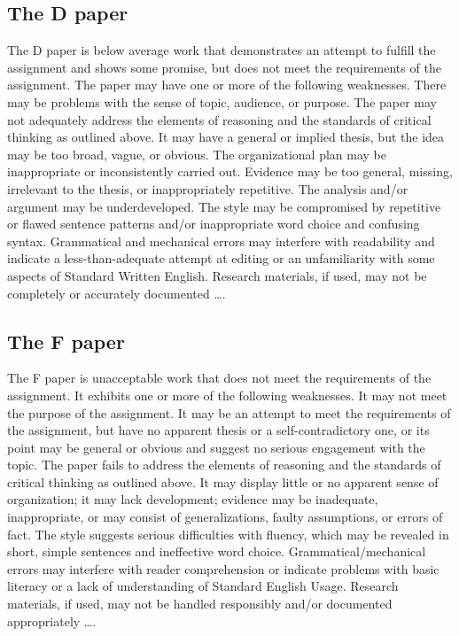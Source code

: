 \subsection{The D paper}

The D paper is below average work that demonstrates an attempt to fulfill the assignment and shows some promise, but does not meet the requirements of the assignment. The paper may have one or more of the following weaknesses. There may be problems with the sense of topic, audience, or purpose. The paper may not adequately address the elements of reasoning and the standards of critical thinking as outlined above. It may have a general or implied thesis, but the idea may be too broad, vague, or obvious. The organizational plan may be inappropriate or inconsistently carried out. Evidence may be too general, missing, irrelevant to the thesis, or inappropriately repetitive. The analysis and/or argument may be underdeveloped. The style may be compromised by repetitive or flawed sentence patterns and/or inappropriate word choice and confusing syntax. Grammatical and mechanical errors may interfere with readability and indicate a less-than-adequate attempt at editing or an unfamiliarity with some aspects of Standard Written English. Research materials, if used, may not be completely or accurately documented \dots.

\subsection{The F paper}

The F paper is unacceptable work that does not meet the requirements of the assignment. It exhibits one or more of the following weaknesses. It may not meet the purpose of the assignment. It may be an attempt to meet the requirements of the assignment, but have no apparent thesis or a self-contradictory one, or its point may be general or obvious and suggest no serious engagement with the topic. The paper fails to address the elements of reasoning and the standards of critical thinking as outlined above. It may display little or no apparent sense of organization; it may lack development; evidence may be inadequate, inappropriate, or may consist of generalizations, faulty assumptions, or errors of fact. The style suggests serious difficulties with fluency, which may be revealed in short, simple sentences and ineffective word choice. Grammatical/mechanical errors may interfere with reader comprehension or indicate problems with basic literacy or a lack of understanding of Standard English Usage. Research materials, if used, may not be handled responsibly and/or documented appropriately \dots.

